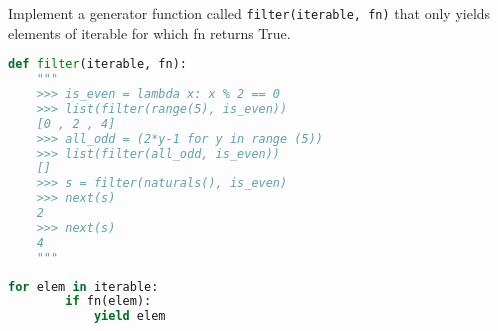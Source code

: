 \question
Implement a generator function called \texttt{filter(iterable, fn)} that only yields
elements of iterable for which fn returns True.

\begin{lstlisting}[language=Python]
def filter(iterable, fn):
    """
    >>> is_even = lambda x: x % 2 == 0
    >>> list(filter(range(5), is_even))
    [0 , 2 , 4]
    >>> all_odd = (2*y-1 for y in range (5))
    >>> list(filter(all_odd, is_even))
    []
    >>> s = filter(naturals(), is_even)
    >>> next(s)
    2
    >>> next(s)
    4
    """
\end{lstlisting}
\begin{solution}[.75in]
\begin{lstlisting}[language=Python]
    for elem in iterable:
        if fn(elem):
            yield elem
\end{lstlisting}
\end{solution}
